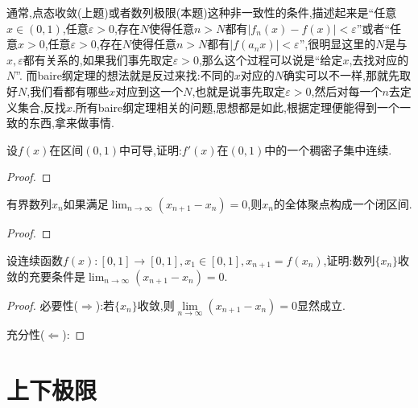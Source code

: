 \documentclass[lang=cn,newtx,10pt,scheme=chinese]{elegantbook}
\begin{document}
\begin{remark}
通常,点态收敛(上题)或者数列极限(本题)这种非一致性的条件,描述起来是“任意\(x\in(0,1)\),任意\(\varepsilon > 0\),存在\(N\)使得任意\(n > N\)都有\(|f_n(x)-f(x)|<\varepsilon\)”或者“任意\(x > 0\),任意\(\varepsilon > 0\),存在\(N\)使得任意\(n > N\)都有\(|f(a_nx)|<\varepsilon\)”,很明显这里的\(N\)是与\(x,\varepsilon\)都有关系的,如果我们事先取定\(\varepsilon > 0\),那么这个过程可以说是“给定\(x\),去找对应的\(N\)”.
而baire纲定理的想法就是反过来找:不同的\(x\)对应的\(N\)确实可以不一样,那就先取好\(N\),我们看都有哪些\(x\)对应到这一个\(N\),也就是说事先取定\(\varepsilon > 0\),然后对每一个\(n\)去定义集合,反找\(x\).所有baire纲定理相关的问题,思想都是如此,根据定理便能得到一个一致的东西,拿来做事情.
\end{remark}

\begin{example}
设\(f(x)\)在区间\((0,1)\)中可导,证明:\(f'(x)\)在\((0,1)\)中的一个稠密子集中连续.
\end{example}
\begin{proof}

\end{proof}

\begin{lemma}
有界数列\(x_n\)如果满足\(\lim_{n\to\infty}(x_{n + 1}-x_n)=0\),则\(x_n\)的全体聚点构成一个闭区间.
\end{lemma}
\begin{proof}

\end{proof}

\begin{example}
设连续函数\(f(x):[0,1]\to[0,1],x_1\in[0,1],x_{n + 1}=f(x_n)\),证明:数列\(\{x_n\}\)收敛的充要条件是\(\lim_{n\to\infty}(x_{n + 1}-x_n)=0\).
\end{example}
\begin{proof}
必要性($\Rightarrow$):若$\{x_n\}$收敛,则$\underset{n\rightarrow \infty}{\lim}\left( x_{n+1}-x_n \right) =0$显然成立.

充分性($\Leftarrow$):
\end{proof}


\section{上下极限}
\end{document}
